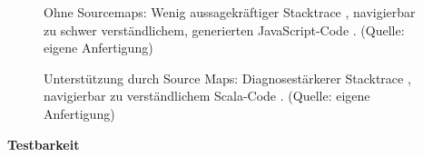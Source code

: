 \documentclass[a4paper, 12pt, hidelinks, listof=totoc, listoftables=totoc, bibliography=totoc]{scrreprt}
\newcommand{\MyMiniSec}[1]{\rmfamily\fontsize{12}{15}\selectfont
	\vspace{7pt}\textbf{#1} %
}
\begin{document}
\begin{figure}[!h]
	\centering
	\caption{Ohne Sourcemaps: Wenig aussagekräftiger Stacktrace \protect{}, navigierbar zu schwer verständlichem, generierten JavaScript-Code \protect{}. (Quelle: eigene Anfertigung)}
	\label{fig:no-sourcemaps}
\end{figure}

\begin{figure}[!h]
	\centering
	\caption{Unterstützung durch Source Maps: Diagnosestärkerer Stacktrace \protect{}, navigierbar zu verständlichem Scala-Code \protect{}. (Quelle: eigene Anfertigung)}
	\label{fig:sourcemaps}
\end{figure}


\MyMiniSec{Testbarkeit}
\end{document}
